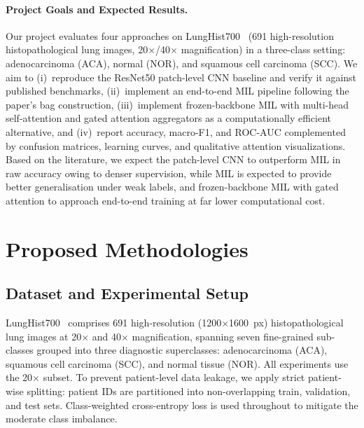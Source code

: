 \documentclass[10pt,twocolumn,letterpaper]{article}
\begin{document}
\paragraph{Project Goals and Expected Results.}
Our project evaluates four approaches on LungHist700~\cite{lunghist700paper} (691 high-resolution histopathological lung images, 20$\times$/40$\times$ magnification) in a three-class setting: adenocarcinoma (ACA), normal (NOR), and squamous cell carcinoma (SCC). We aim to (i)~reproduce the ResNet50 patch-level CNN baseline and verify it against published benchmarks, (ii)~implement an end-to-end MIL pipeline following the paper's bag construction, (iii)~implement frozen-backbone MIL with multi-head self-attention and gated attention aggregators as a computationally efficient alternative, and (iv)~report accuracy, macro-F1, and ROC-AUC complemented by confusion matrices, learning curves, and qualitative attention visualizations. Based on the literature, we expect the patch-level CNN to outperform MIL in raw accuracy owing to denser supervision, while MIL is expected to provide better generalisation under weak labels, and frozen-backbone MIL with gated attention to approach end-to-end training at far lower computational cost.

\section{Proposed Methodologies}
\label{sec:method}

\subsection{Dataset and Experimental Setup}
LungHist700~\cite{lunghist700paper} comprises 691 high-resolution (1200$\times$1600~px) histopathological lung images at 20$\times$ and 40$\times$ magnification, spanning seven fine-grained sub-classes grouped into three diagnostic superclasses: adenocarcinoma (ACA), squamous cell carcinoma (SCC), and normal tissue (NOR). All experiments use the 20$\times$ subset. To prevent patient-level data leakage, we apply strict patient-wise splitting: patient IDs are partitioned into non-overlapping train, validation, and test sets. Class-weighted cross-entropy loss is used throughout to mitigate the moderate class imbalance.
\end{document}
